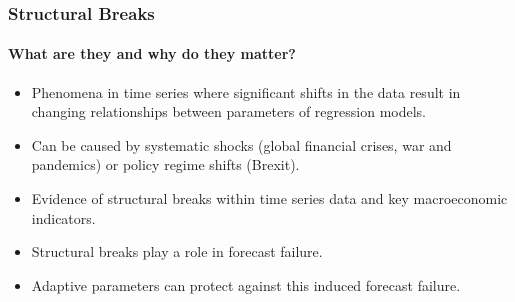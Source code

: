 \begin{frame}
    \frametitle{Structural Breaks}
    \framesubtitle{What are they and why do they matter?}
    \begin{itemize}
        \item Phenomena in time series where significant shifts in the data result in changing relationships between parameters of regression models.
        \item Can be caused by systematic shocks (global financial crises, war and pandemics) or policy regime shifts (Brexit).
        \item Evidence of structural breaks within time series data and key macroeconomic indicators. \parencite{stock_evidence_1996}
        \item Structural breaks play a role in forecast failure. \parencite{stock_evidence_1996, andrews_forecasting_2005}
        \item Adaptive parameters can protect against this induced forecast failure. \parencite{andrews_forecasting_2005,castle_nowcasting_2009}
    \end{itemize}
\end{frame}